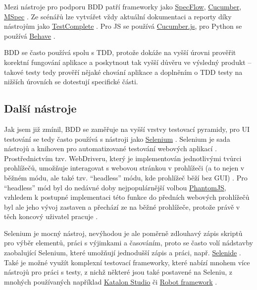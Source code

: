 Mezi nástroje pro podporu BDD patří frameworky jako \href{https://specflow.org/}{SpecFlow}, \href{https://cucumber.io/}{Cucumber}, \href{https://github.com/machine/machine.specifications}{MSpec} \cite{test-swtestinghelp2}. Ze scénářů lze vytvářet vždy aktuální dokumentaci a reporty díky nástrojům jako \href{https://smartbear.com/product/testcomplete/overview/}{TestComplete} \cite{test-smartbear2}. Pro JS se používá \href{https://cucumber.io/docs/installation/javascript/}{Cucumber.js}, pro Python se používá \href{https://behave.readthedocs.io/en/latest/}{Behave} \cite{test-chart-bdd}.

BDD se často používá spolu s TDD, protože dokáže na vyšší úrovni prověřit korektní fungování aplikace a poskytnout tak vyšší důvěru ve výsledný produkt \cite{test-cucumber1} -- takové testy tedy prověří nějaké chování aplikace a doplněním o TDD testy na nižších úrovních se dotestují specifické části.

\subsection{Další nástroje}

Jak jsem již zmínil, BDD se zaměřuje na vyšší vrstvy testovací pyramidy, pro UI testování se tedy často používá s nástroji jako \href{https://www.selenium.dev/}{Selenium} \cite{test-dzone}. Selenium je sada nástrojů a knihoven pro automatizované testování webových aplikací \cite{test-seleniumdocs}. Prostřednictvím tzv. WebDriveru, který je implementován jednotlivými tvůrci prohlížečů, umožňuje interagovat s webovou stránkou v prohlížeči (a to nejen v běžném módu, ale také tzv. \enquote{headless} módu, kde prohlížeč běží bez GUI) \cite{test-hackernoon1, test-seleniumdocs}. Pro \enquote{headless} mód byl do nedávné doby nejpopulárnější volbou \href{https://phantomjs.org/}{PhantomJS}, vzhledem k postupné implementaci této funkce do předních webových prohlížečů byl ale jeho vývoj zastaven a přechází ze na běžné prohlížeče, protože právě v těch koncový uživatel pracuje \cite{test-fowler, test-phantomjs}.

Selenium je mocný nástroj, nevýhodou je ale poměrně zdlouhavý zápis skriptů pro výběr elementů, práci s výjimkami a časováním, proto se často volí nádstavby zaobalující Selenium, které umožňují jednodušší zápis a práci, např. \href{https://selenide.org/}{Selenide} \cite{test-hackernoon1}. Také je možné využít komplexní testovací frameworky, které nabízí mnohem více nástrojů pro práci s testy, z nichž některé jsou také postavené na Seleniu, z mnohých používaných například \href{https://www.katalon.com/}{Katalon Studio} či \href{https://robotframework.org/}{Robot framework} \cite{test-selenium3, test-katalon}.

